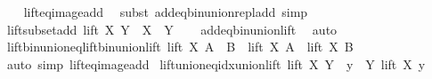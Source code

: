 \begin{isabellebody}
%
\isadelimproof
\ \ %
\endisadelimproof
%
\isatagproof
{}\isamarkupfalse%
\ lift{\isacharunderscore}{\kern0pt}eq{\isacharunderscore}{\kern0pt}image{\isacharunderscore}{\kern0pt}add\ \isamarkupfalse%
\ {\isacharparenleft}{\kern0pt}subst\ add{\isacharunderscore}{\kern0pt}eq{\isacharunderscore}{\kern0pt}bin{\isacharunderscore}{\kern0pt}union{\isacharunderscore}{\kern0pt}repl{\isacharunderscore}{\kern0pt}add{\isacharparenright}{\kern0pt}\ simp%
\endisatagproof
{\isafoldproof}%
%
\isadelimproof
\isanewline
%
\endisadelimproof
\isanewline
{}\isamarkupfalse%
\ lift{\isacharunderscore}{\kern0pt}subset{\isacharunderscore}{\kern0pt}add{\isacharcolon}{\kern0pt}\ {\isachardoublequoteopen}lift\ X\ Y\ {\isasymsubseteq}\ X\ {\isacharplus}{\kern0pt}\ Y{\isachardoublequoteclose}\isanewline
%
\isadelimproof
\ \ %
\endisadelimproof
%
\isatagproof
{}\isamarkupfalse%
\ add{\isacharunderscore}{\kern0pt}eq{\isacharunderscore}{\kern0pt}bin{\isacharunderscore}{\kern0pt}union{\isacharunderscore}{\kern0pt}lift\ \isamarkupfalse%
\ auto%
\endisatagproof
{\isafoldproof}%
%
\isadelimproof
%
\endisadelimproof
%
\isadelimdocument
%
\endisadelimdocument
%
\isatagdocument
%
\isamarkuptrue%
%
\endisatagdocument
{\isafolddocument}%
%
\isadelimdocument
%
\endisadelimdocument
{}\isamarkupfalse%
\ lift{\isacharunderscore}{\kern0pt}bin{\isacharunderscore}{\kern0pt}union{\isacharunderscore}{\kern0pt}eq{\isacharunderscore}{\kern0pt}lift{\isacharunderscore}{\kern0pt}bin{\isacharunderscore}{\kern0pt}union{\isacharunderscore}{\kern0pt}lift{\isacharcolon}{\kern0pt}\ {\isachardoublequoteopen}lift\ X\ {\isacharparenleft}{\kern0pt}A\ {\isasymunion}\ B{\isacharparenright}{\kern0pt}\ {\isacharequal}{\kern0pt}\ lift\ X\ A\ {\isasymunion}\ lift\ X\ B{\isachardoublequoteclose}\isanewline
%
\isadelimproof
\ \ %
\endisadelimproof
%
\isatagproof
{}\isamarkupfalse%
\ {\isacharparenleft}{\kern0pt}auto\ simp{\isacharcolon}{\kern0pt}\ lift{\isacharunderscore}{\kern0pt}eq{\isacharunderscore}{\kern0pt}image{\isacharunderscore}{\kern0pt}add{\isacharparenright}{\kern0pt}%
\endisatagproof
{\isafoldproof}%
%
\isadelimproof
\isanewline
%
\endisadelimproof
\isanewline
{}\isamarkupfalse%
\ lift{\isacharunderscore}{\kern0pt}union{\isacharunderscore}{\kern0pt}eq{\isacharunderscore}{\kern0pt}idx{\isacharunderscore}{\kern0pt}union{\isacharunderscore}{\kern0pt}lift{\isacharcolon}{\kern0pt}\ {\isachardoublequoteopen}lift\ X\ {\isacharparenleft}{\kern0pt}{\isasymUnion}Y{\isacharparenright}{\kern0pt}\ {\isacharequal}{\kern0pt}\ {\isacharparenleft}{\kern0pt}{\isasymUnion}y\ {\isasymin}\ Y{\isachardot}{\kern0pt}\ lift\ X\ y{\isacharparenright}{\kern0pt}{\isachardoublequoteclose}\isanewline

\end{isabellebody}
